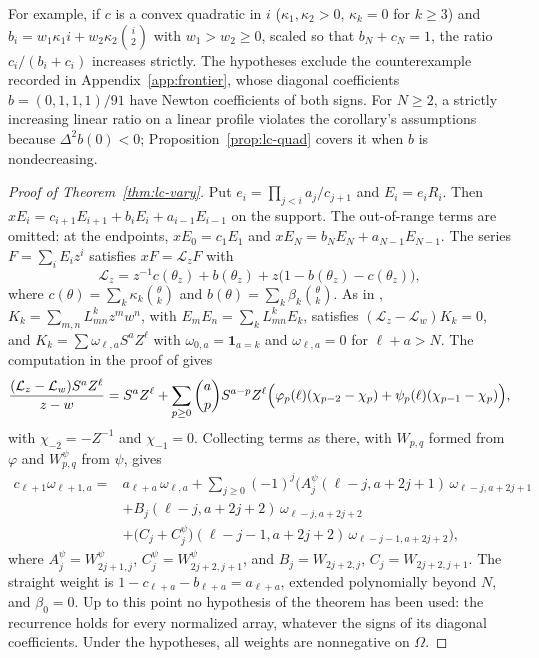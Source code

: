 For example, if $c$ is a convex quadratic in $i$ ($\kappa_1,\kappa_2>0$, $\kappa_k=0$ for $k\geq3$) and $b_i=w_1\kappa_1i+w_2\kappa_2\binom i2$ with $w_1>w_2\geq0$, scaled so that $b_N+c_N=1$, the ratio $c_i/(b_i+c_i)$ increases strictly. The hypotheses exclude the counterexample recorded in Appendix~\ref{app:frontier}, whose diagonal coefficients $b=(0,1,1,1)/91$ have Newton coefficients of both signs. For $N\geq2$, a strictly increasing linear ratio on a linear profile violates the corollary's assumptions because $\Delta^2b(0)<0$; Proposition~\ref{prop:lc-quad} covers it when $b$ is nondecreasing.

\begin{proof}[Proof of Theorem~\ref{thm:lc-vary}]
Put $e_i=\prod_{j<i}a_j/c_{j+1}$ and $E_i=e_iR_i$. Then $xE_i=c_{i+1}E_{i+1}+b_iE_i+a_{i-1}E_{i-1}$ on the support. The out-of-range terms are omitted: at the endpoints, $xE_0=c_1E_1$ and $xE_N=b_NE_N+a_{N-1}E_{N-1}$. The series $F=\sum_iE_iz^i$ satisfies $xF=\mathcal L_zF$ with
\[
\mathcal L_z=z^{-1}c(\theta_z)+b(\theta_z)+z\bigl(1-b(\theta_z)-c(\theta_z)\bigr),
\]
where $c(\theta)=\sum_k\kappa_k\binom\theta k$ and $b(\theta)=\sum_k\beta_k\binom\theta k$. As in \cite[Section~]{P1}, $K_k=\sum_{m,n}L_{mn}^kz^mw^n$, with $E_mE_n=\sum_kL_{mn}^kE_k$, satisfies $(\mathcal L_z-\mathcal L_w)K_k=0$, and $K_k=\sum\omega_{\ell,a}S^aZ^\ell$ with $\omega_{0,a}=\mathbf1_{a=k}$ and $\omega_{\ell,a}=0$ for $\ell+a>N$. The computation in the proof of \cite[Lemma~]{P1} gives
\[
\frac{(\mathcal L_z-\mathcal L_w)S^aZ^\ell}{z-w}=S^aZ^\ell+\sum_{p\geq0}\binom apS^{a-p}Z^\ell\Bigl(\varphi_p(\ell)(\chi_{p-2}-\chi_p)+\psi_p(\ell)(\chi_{p-1}-\chi_p)\Bigr),
\]
with $\chi_{-2}=-Z^{-1}$ and $\chi_{-1}=0$. Collecting terms as there, with $W_{p,q}$ formed from $\varphi$ and $W^\psi_{p,q}$ from $\psi$, gives
\[
\begin{aligned}
c_{\ell+1}\omega_{\ell+1,a}={}&a_{\ell+a}\,\omega_{\ell,a}+\sum_{j\geq0}(-1)^j\Big(A^\psi_j(\ell-j,a+2j+1)\,\omega_{\ell-j,a+2j+1}\\
&+B_j(\ell-j,a+2j+2)\,\omega_{\ell-j,a+2j+2}\\
&+\bigl(C_j+C^\psi_j\bigr)(\ell-j-1,a+2j+2)\,\omega_{\ell-j-1,a+2j+2}\Big),
\end{aligned}
\]
where $A^\psi_j=W^\psi_{2j+1,j}$, $C^\psi_j=W^\psi_{2j+2,j+1}$, and $B_j=W_{2j+2,j}$, $C_j=W_{2j+2,j+1}$. The straight weight is $1-c_{\ell+a}-b_{\ell+a}=a_{\ell+a}$, extended polynomially beyond $N$, and $\beta_0=0$. Up to this point no hypothesis of the theorem has been used: the recurrence holds for every normalized array, whatever the signs of its diagonal coefficients. Under the hypotheses, all weights are nonnegative on $\Omega$.


\end{proof}
